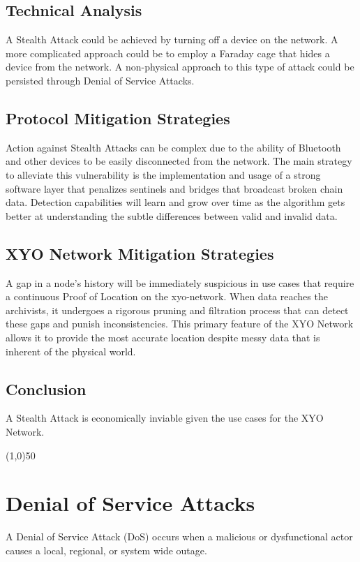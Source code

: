 \documentclass{article}
\begin{document}
\subsection{Technical Analysis}
A Stealth Attack could be achieved by turning off a device on the network. A more complicated approach could be to employ a Faraday cage that hides a device from the network. A non-physical approach to this type of attack could be persisted through Denial of Service Attacks. 

\subsection{Protocol Mitigation Strategies}
Action against Stealth Attacks can be complex due to the ability of Bluetooth and other devices to be easily disconnected from the network. The main strategy to alleviate this vulnerability is the implementation and usage of a strong software layer that penalizes \Glspl{sentinel} and \Glspl{bridge} that broadcast broken chain data. Detection capabilities will learn and grow over time as the algorithm gets better at understanding the subtle differences between valid and invalid data.

\subsection{XYO Network Mitigation Strategies}
A gap in a node's history will be immediately suspicious in use cases that require a continuous Proof of Location on the \Gls{xyo-network}. When data reaches the \Glspl{archivist}, it undergoes a rigorous pruning and filtration process that can detect these gaps and punish inconsistencies. This primary feature of the XYO Network allows it to provide the most accurate location despite messy data that is inherent of the physical world. 

\subsection{Conclusion}
A Stealth Attack is economically inviable given the use cases for the XYO Network.

\begin{center}
\line(1,0){50}
\end{center}

\section{Denial of Service Attacks}
A Denial of Service Attack (DoS) occurs when a malicious or dysfunctional actor causes a local, regional, or system wide outage. 
\end{document}

